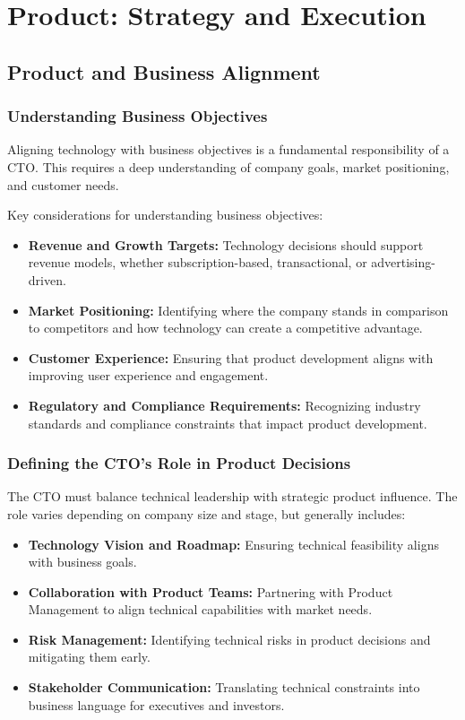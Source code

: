 \chapter{Product: Strategy and Execution}

\section{Product and Business Alignment}

\subsection{Understanding Business Objectives}
Aligning technology with business objectives is a fundamental responsibility of a CTO. This requires a deep understanding of company goals, market positioning, and customer needs.

Key considerations for understanding business objectives:

\begin{itemize}
    \item \textbf{Revenue and Growth Targets:} Technology decisions should support revenue models, whether subscription-based, transactional, or advertising-driven.
    \item \textbf{Market Positioning:} Identifying where the company stands in comparison to competitors and how technology can create a competitive advantage.
    \item \textbf{Customer Experience:} Ensuring that product development aligns with improving user experience and engagement.
    \item \textbf{Regulatory and Compliance Requirements:} Recognizing industry standards and compliance constraints that impact product development.
\end{itemize}

\subsection{Defining the CTO's Role in Product Decisions}
The CTO must balance technical leadership with strategic product influence. The role varies depending on company size and stage, but generally includes:

\begin{itemize}
    \item \textbf{Technology Vision and Roadmap:} Ensuring technical feasibility aligns with business goals.
    \item \textbf{Collaboration with Product Teams:} Partnering with Product Management to align technical capabilities with market needs.
    \item \textbf{Risk Management:} Identifying technical risks in product decisions and mitigating them early.
    \item \textbf{Stakeholder Communication:} Translating technical constraints into business language for executives and investors.
\end{itemize}

